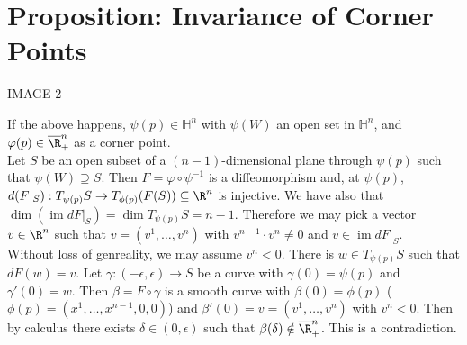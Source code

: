 \documentclass[11pt]{article}
\begin{document}
\section*{Proposition: Invariance of Corner Points}
\label{sec:org794e351}
\begin{center}
IMAGE 2\\
\end{center}
If the above happens, \(\psi(p)\in\mathbb{H}^{n}\) with \(\psi(W)\) an open set in \(\mathbb{H}^{n}\), and \(\varphi(p)\in\overline{\R}^{n}_{+}\) as a corner point.\\
Let \(S\) be an open subset of a \((n-1)\)-dimensional plane through \(\psi(p)\) such that \(\psi(W)\supseteq S\). Then \(F=\varphi\circ\psi^{-1}\) is a diffeomorphism and, at \(\psi(p)\), \(d(F|_{S}):T_{\psi(p)}S\to T_{\phi(p)}(F(S))\subseteq\R^{n}\) is injective. We have also that \(\dim(\operatorname{im}dF|_{S})=\dim T_{\psi(p)}S=n-1\). Therefore we may pick a vector \(v\in\R^{n}\) such that \(v=(v^{1},\ldots,v^{n})\) with \(v^{n-1}\cdot v^{n}\neq0\) and \(v\in\operatorname{im}dF|_{S}\).\\
Without loss of genreality, we may assume \(v^{n}<0\). There is \(w\in T_{\psi(p)}S\) such that \(dF(w)=v\). Let \(\gamma:(-\epsilon,\epsilon)\to S\) be a curve with \(\gamma(0)=\psi(p)\) and \(\gamma'(0)=w\). Then \(\beta=F\circ\gamma\) is a smooth curve with \(\beta(0)=\phi(p)\) (\(\phi(p)=(x^{1},\ldots,x^{n-1},0,0)\)) and \(\beta'(0)=v=(v^{1},\ldots,v^{n})\) with \(v^{n}<0\). Then by calculus there exists \(\delta\in(0,\epsilon)\) such that \(\beta(\delta)\notin\overline{\R}^{n}_{+}\). This is a contradiction.\\
\end{document}
